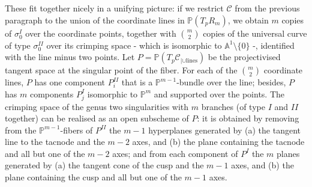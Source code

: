 \documentclass[11pt]{amsart}
\newcommand{\PP}{\mathbb P}
\newcommand{\Aaff}{\mathbb A}
\theoremstyle{plain}
\theoremstyle{definition}
\begin{document}
These fit together nicely in a unifying picture: if we restrict $\mathcal C$ from the previous paragraph to the union of the coordinate lines in $\PP(T_pR_m)$, we obtain $m$ copies of $\sigma_0^{I}$ over the coordinate points, together with $\binom{m}{2}$ copies of the universal curve of type $\sigma_0^{I\!I}$ over its crimping space - which is isomorphic to $\Aaff^1\setminus\{0\}$ -, identified with the line minus two points. Let $P=\PP(T_p\mathcal C_{|\cup\text{lines}})$ be the projectivised tangent space at the singular point of the fiber. For each of the $\binom{m}{2}$ coordinate lines, $P$ has one component $P^{I\!I}_i$ that is a $\PP^{m-1}$-bundle over the line; besides, $P$ has $m$ components $P^{I}_j$ isomorphic to $\PP^m$ and supported over the points. The crimping space of the genus two singularities with $m$ branches (of type $I$ and $I\!I$ together) can be realised as an open subscheme of $P$: it is obtained by removing from the $\PP^{m-1}$-fibers of $P^{I\!I}$ the $m-1$ hyperplanes generated by (a) the tangent line to the tacnode and the $m-2$ axes, and (b) the plane containing the tacnode and all but one of the $m-2$ axes; and from each component of $P^{I}$ the $m$ planes generated by (a) the tangent cone of the cusp and the $m-1$ axes, and (b) the plane containing the cusp and all but one of the $m-1$ axes.
\end{document}
